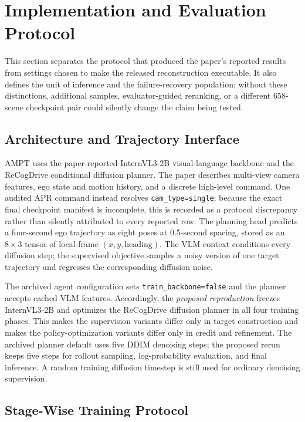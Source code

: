 \section{Implementation and Evaluation Protocol}
\label{sec:implementation}

This section separates the protocol that produced the paper's reported results
from settings chosen to make the released reconstruction executable.  It also
defines the unit of inference and the failure-recovery population; without
these distinctions, additional samples, evaluator-guided reranking, or a
different 658-scene checkpoint pair could silently change the claim being
tested.

\subsection{Architecture and Trajectory Interface}
\label{sec:architecture}

AMPT uses the paper-reported InternVL3-2B visual-language backbone and the
ReCogDrive conditional diffusion planner.  The paper describes multi-view
camera features, ego state and motion history, and a discrete high-level
command.  One audited APR command instead resolves \texttt{cam\_type=single};
because the exact final checkpoint manifest is incomplete, this is recorded as
a protocol discrepancy rather than silently attributed to every reported row.
The planning head predicts a four-second ego trajectory as eight
poses at 0.5-second spacing, stored as an $8\times3$ tensor of local-frame
$(x,y,\mathrm{heading})$.  The VLM context conditions every diffusion step;
the supervised objective samples a noisy version of one target trajectory and
regresses the corresponding diffusion noise.

The archived agent configuration sets \texttt{train\_backbone=false} and the
planner accepts cached VLM features.  Accordingly, the \emph{proposed
reproduction} freezes InternVL3-2B and optimizes the ReCogDrive diffusion
planner in all four training phases.  This makes the supervision variants
differ only in target construction and makes the policy-optimization variants
differ only in credit and refinement.  The archived planner default uses five
DDIM denoising steps; the proposed rerun keeps five steps for rollout sampling,
log-probability evaluation, and final inference.  A random training diffusion
timestep is still used for ordinary denoising supervision.

\subsection{Stage-Wise Training Protocol}
\label{sec:training-protocol}

